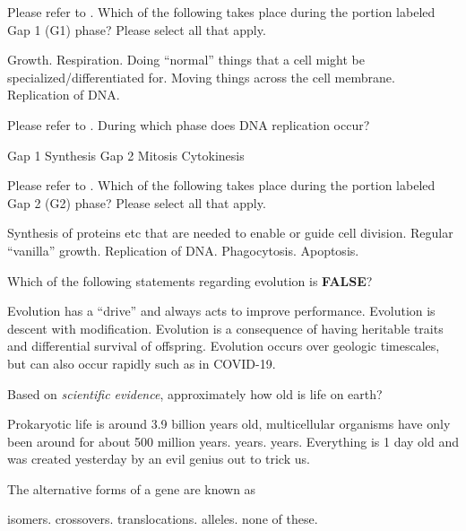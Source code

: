 \documentclass[exam,addpoints,noanswers]{exam}
\begin{document}
\begin{questions}
\question[1] Please refer to . Which of the following takes place during the portion labeled Gap 1 (G1) phase? Please select all that apply. 
\begin{choices}
\CorrectChoice Growth.
\CorrectChoice Respiration.
\CorrectChoice Doing ``normal'' things that a cell might be specialized/differentiated for.
\CorrectChoice Moving things across the cell membrane. 
\choice Replication of DNA. 
\end{choices}

\question[1] Please refer to . During which phase does DNA replication occur? 
\begin{choices}
\choice Gap 1
\CorrectChoice Synthesis
\choice Gap 2
\choice Mitosis
\choice Cytokinesis
\end{choices}

\question[1] Please refer to . Which of the following takes place during the portion labeled Gap 2 (G2) phase? Please select all that apply. 
\begin{choices}
\CorrectChoice Synthesis of proteins etc that are needed to enable or guide cell division.
\choice Regular ``vanilla'' growth.
\choice Replication of DNA.
\choice Phagocytosis.
\choice Apoptosis.  
\end{choices}

\clearpage
\question[1] Which of the following statements regarding evolution is \textbf{FALSE}?
\begin{choices}
\CorrectChoice Evolution has a ``drive'' and always acts to improve performance.
\choice Evolution is descent with modification.
\choice Evolution is a consequence of having heritable traits and differential survival of offspring.
\choice Evolution occurs over geologic timescales, but can also occur rapidly such as in COVID-19.
\end{choices}

\question[1] Based on \emph{scientific evidence}, approximately how old is life on earth?
\begin{choices}
\CorrectChoice Prokaryotic life is around 3.9 billion years old, multicellular organisms have only been around for about 500 million years.
 years.
 years.
\choice Everything is 1 day old and was created yesterday by an evil genius out to trick us. 
\end{choices}

\question[1] The alternative forms of a gene are known as
\begin{choices}
\choice isomers. 
\choice crossovers. 
\choice translocations. 
\CorrectChoice alleles. 
\choice none of these.
\end{choices}






\end{questions}
\end{document}
